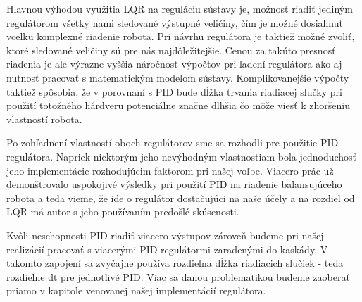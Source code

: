 Hlavnou výhodou využitia LQR na reguláciu sústavy je, možnosť riadiť jediným regulátorom všetky nami sledované výstupné veličiny, čím je možné dosiahnuť vcelku komplexné riadenie robota. Pri návrhu regulátora je taktiež možné zvoliť, ktoré sledované veličiny sú pre nás najdôležitejšie. Cenou za takúto presnosť riadenia je ale výrazne vyššia náročnosť výpočtov pri ladení regulátora ako aj nutnosť pracovať s matematickým modelom sústavy. Komplikovanejšie výpočty taktiež spôsobia, že v porovnaní s PID bude dĺžka trvania riadiacej slučky pri použití totožného hárdveru potenciálne značne dlhšia čo môže viesť k zhoršeniu vlastností robota.

Po zohľadnení vlastností oboch regulátorov sme sa rozhodli pre použitie PID regulátora. Napriek niektorým jeho nevýhodným vlastnostiam bola jednoduchosť jeho implementácie rozhodujúcim faktorom pri našej voľbe. Viacero prác už demonštrovalo uspokojivé výsledky pri použití PID na riadenie balansujúceho robota a teda vieme, že ide o regulátor dostačujúci na naše účely a na rozdiel od LQR má autor s jeho používaním predošlé skúsenosti. 

Kvôli neschopnosti PID riadiť viacero výstupov zároveň budeme pri našej realizácií pracovať s viacerými PID regulátormi zaradenými do kaskády. V takomto zapojení sa zvyčajne používa rozdielna dĺžka riadiacich slučiek - teda  rozdielne dt pre jednotlivé PID. Viac sa danou problematikou budeme zaoberať priamo v kapitole venovanej našej implementácií regulátora.